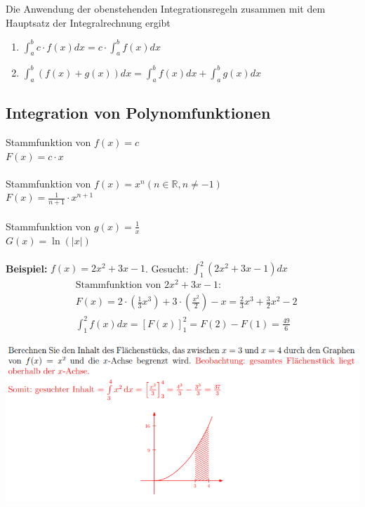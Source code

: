 Die Anwendung der obenstehenden Integrationsregeln zusammen mit dem Hauptsatz der Integralrechnung ergibt

\begin{enumerate}
    \item $\int_{a}^{b} c \cdot f(x) dx = c \cdot \int_{a}^{b} f(x) dx$
    \item $\int_{a}^{b}(f(x) + g(x)) dx = \int_{a}^{b} f(x) dx + \int_{a}^{b} g(x) dx$
\end{enumerate}

\vfill

\subsection{Integration von Polynomfunktionen}
Stammfunktion von $f(x) = c$ \\
$F(x)=c\cdot x$ \\
\\
Stammfunktion von $f(x) = x^n (n \in \mathbb{R}, n \neq -1)$ \\
$F(x)=\frac{1}{n+1} \cdot x^{n+1}$ \\
\\
Stammfunktion von $g(x) = \frac{1}{x}$ \\
$G(x) = \ln(|x|)$ \\
\\
\textbf{Beispiel: } $f(x) = 2x^2 + 3x -1$. Gesucht: $\int_{1}^{2} (2x^2 + 3x -1) dx$
\begin{align*}
    &\text{Stammfunktion von } 2x^2 + 3x -1: \\
    & F(x) = 2 \cdot (\frac{1}{3}x^3) + 3 \cdot (\frac{x^2}{2}) - x = \frac{2}{3}x^3 + \frac{3}{2}x^2 - 2 \\
    & \int_{1}^{2} f(x) dx = [F(x)]_1^2 = F(2)- F(1) = \frac{49}{6}
\end{align*}

\begin{center}
    \includegraphics[width=1\linewidth]{images/integrationbsp.png}
\end{center}

